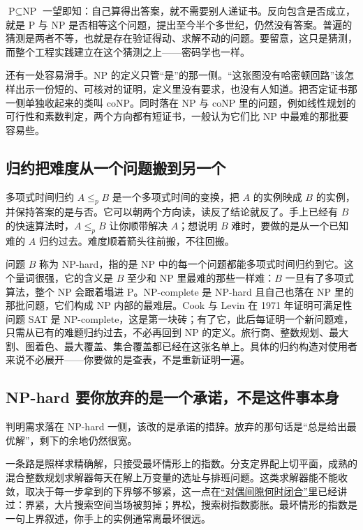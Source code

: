 \(\text{P}\subseteq\text{NP}\) 一望即知：自己算得出答案，就不需要别人递证书。反向包含是否成立，就是 P 与 NP 是否相等这个问题，提出至今半个多世纪，仍然没有答案。普遍的猜测是两者不等，也就是存在验证得动、求解不动的问题。要留意，这只是猜测，而整个工程实践建立在这个猜测之上——密码学也一样。

还有一处容易滑手。NP 的定义只管``是''的那一侧。``这张图没有哈密顿回路''该怎样出示一份短的、可核对的证明，定义里没有要求，也没有人知道。把否定证书那一侧单独收起来的类叫 coNP。同时落在 NP 与 coNP 里的问题，例如线性规划的可行性和素数判定，两个方向都有短证书，一般认为它们比 NP 中最难的那批要容易些。

\subsection{归约把难度从一个问题搬到另一个}

多项式时间归约 \(A\le_p B\) 是一个多项式时间的变换，把 \(A\) 的实例映成 \(B\) 的实例，并保持答案的是与否。它可以朝两个方向读，读反了结论就反了。手上已经有 \(B\) 的快速算法时，\(A\le_p B\) 让你顺带解决 \(A\)；想说明 \(B\) 难时，要做的是从一个已知难的 \(A\) 归约过去。难度顺着箭头往前搬，不往回搬。

问题 \(B\) 称为 NP-hard，指的是 NP 中的每一个问题都能多项式时间归约到它。这个量词很强，它的含义是 \(B\) 至少和 NP 里最难的那些一样难：\(B\) 一旦有了多项式算法，整个 NP 会跟着塌进 P。NP-complete 是 NP-hard 且自己也落在 NP 里的那批问题，它们构成 NP 内部的最难层。Cook 与 Levin 在 1971 年证明可满足性问题 SAT 是 NP-complete，这是第一块砖；有了它，此后每证明一个新问题难，只需从已有的难题归约过去，不必再回到 NP 的定义。旅行商、整数规划、最大割、图着色、最大覆盖、集合覆盖都已经在这张名单上。具体的归约构造对使用者来说不必展开——你要做的是查表，不是重新证明一遍。

\subsection{NP-hard 要你放弃的是一个承诺，不是这件事本身}

判明需求落在 NP-hard 一侧，该改的是承诺的措辞。放弃的那句话是``总是给出最优解''，剩下的余地仍然很宽。

一条路是照样求精确解，只接受最坏情形上的指数。分支定界配上切平面，成熟的混合整数规划求解器每天在解上万变量的选址与排班问题。这类求解器能不能收敛，取决于每一步拿到的下界够不够紧，这一点在\hyperref[sec:09-Convex-Optimization/05-Duality/02]{``对偶间隙何时闭合''}里已经讲过：界紧，大片搜索空间当场被剪掉；界松，搜索树指数膨胀。最坏情形的指数是一句上界叙述，你手上的实例通常离最坏很远。

